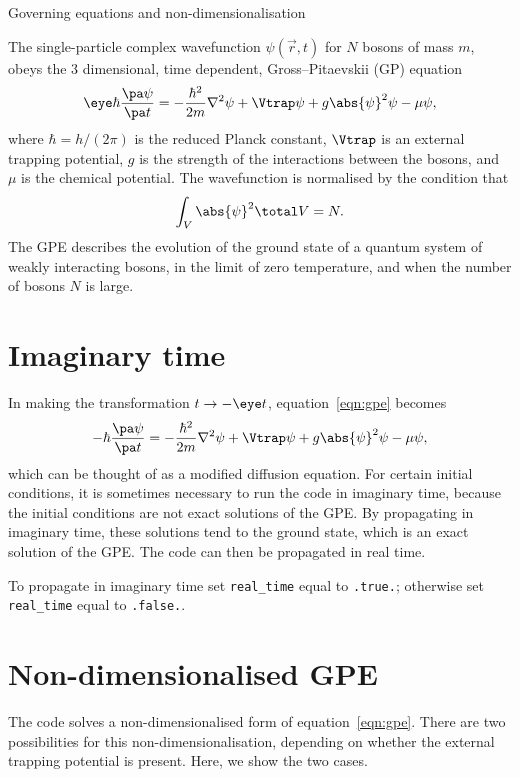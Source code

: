 
\begin{chapter}{\label{cha:equations}Governing equations and
  non-dimensionalisation}

  The single-particle complex wavefunction $\psi(\vec{r}, t)$ for $N$ bosons of
  mass $m$, obeys the 3 dimensional, time dependent, Gross--Pitaevskii (GP)
  equation \citep{Gross61,Pitaevskii61}
  \begin{equation}
    \eye \hbar \frac{\pa \psi}{\pa t} = -\frac{\hbar^{2}}{2m} \nabla^{2} \psi +
    \Vtrap \psi + g \abs{\psi}^{2} \psi - \mu \psi,
    \label{eqn:gpe}
  \end{equation}
  where $\hbar = h/(2\pi)$ is the reduced Planck constant, $\Vtrap$ is an
  external trapping potential, $g$ is the strength of the interactions between
  the bosons, and $\mu$ is the chemical potential.  The wavefunction is
  normalised by the condition that
  \begin{equation*}
    \int_{V}{\abs{\psi}^{2}}\total V = N.
  \end{equation*}
  The GPE describes the evolution of the ground state of a quantum system of
  weakly interacting bosons, in the limit of zero temperature, and when the
  number of bosons $N$ is large.

  \section{Imaginary time}
  In making the transformation $t \to -\eye t$, equation~\eqref{eqn:gpe}
  becomes
  \begin{equation*}
    -\hbar \frac{\pa \psi}{\pa t} = -\frac{\hbar^{2}}{2m} \nabla^{2} \psi +
    \Vtrap \psi + g \abs{\psi}^{2} \psi - \mu \psi,
  \end{equation*}
  which can be thought of as a modified diffusion equation.  For certain
  initial conditions, it is sometimes necessary to run the code in imaginary
  time, because the initial conditions are not exact solutions of the GPE.  By
  propagating in imaginary time, these solutions tend to the ground state,
  which is an exact solution of the GPE.  The code can then be propagated in
  real time.

  To propagate in imaginary time set \verb"real_time" equal to \verb".true.";
  otherwise set \verb"real_time" equal to \verb".false.".

  \section{\label{sec:nondimgpe}Non-dimensionalised GPE}
  The code solves a non-dimensionalised form of equation~\eqref{eqn:gpe}.
  There are two possibilities for this non-dimensionalisation, depending on
  whether the external trapping potential is present.  Here, we show the two
  cases.


\end{chapter}
